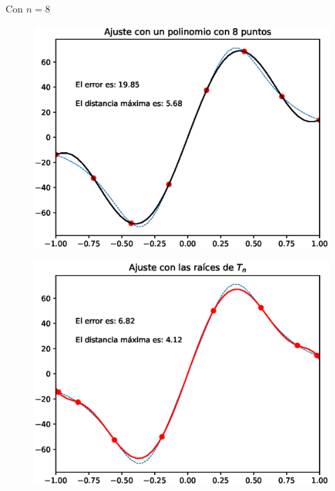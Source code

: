 Con $n = 8$
\\
\begin{minipage}{0.45\linewidth}
    \begin{figure}[H]
    \centering
    \includegraphics[scale=0.44]{Imagenes/Interpolacion_Chebychev_08_Polinomio.eps}
    \end{figure}       
\end{minipage}
\hspace{0.1cm}
\begin{minipage}{0.45\linewidth}
\begin{figure}[H]
    \centering
    \includegraphics[scale=0.44]{Imagenes/Interpolacion_Chebychev_08_Raices.eps}
\end{figure}
\end{minipage}

